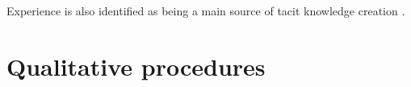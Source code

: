 Experience is also identified as being a main source of tacit knowledge creation \citep{nonaka1995knowledge,sternberg1999tacit}.

\section{Qualitative procedures}



% 




